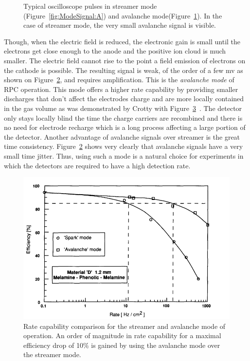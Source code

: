 \begin{figure}[H]
\begin{subfigure}{0.5\linewidth}
			\caption{\label{fig:ModeSignal:B}}
		\end{subfigure}
		\caption{\label{fig:ModeSignal} Typical oscilloscope pulses in streamer mode (Figure~\ref{fig:ModeSignal:A}) and avalanche mode(Figure~\ref{fig:ModeSignal:B}). In the case of streamer mode, the very small avalanche signal is visible.}
	\end{figure}
	
	Though, when the electric field is reduced, the electronic gain is small until the electrons get close enough to the anode and the positive ion cloud is much smaller. The electric field cannot rise to the point a field emission of electrons on the cathode is possible. The resulting signal is weak, of the order of a few \si{mv} as shown on Figure~\ref{fig:ModeSignal}, and requires amplification. This is the \textit{avalanche mode} of RPC operation. This mode offers a higher rate capability by providing smaller discharges that don't affect the electrodes charge and are more locally contained in the gas volume as was demonstrated by Crotty with Figure~\ref{fig:ModeRate}~\cite{CROTTY93}. The detector only stays locally blind the time the charge carriers are recombined and there is no need for electrode recharge which is a long process affecting a large portion of the detector. Another advantage of avalanche signals over streamer is the great time consistency. Figure~\ref{fig:ModeSignal} shows very clearly that avalanche signals have a very small time jitter. Thus, using such a mode is a natural choice for experiments in which the detectors are required to have a high detection rate.
	
	\begin{figure}[H]
		\centering
		\includegraphics[width = \plotwidth]{fig/chapt4/Rate_Mode_Comparison.png}
		\caption{\label{fig:ModeRate} Rate capability comparison for the streamer and avalanche mode of operation. An order of magnitude in rate capability for a maximal efficiency drop of 10\% is gained by using the avalanche mode over the streamer mode.}
	\end{figure}

